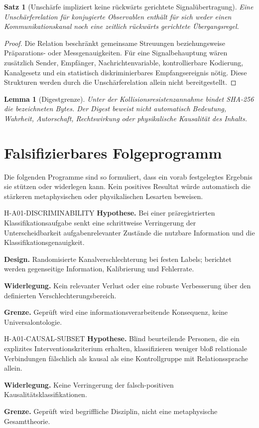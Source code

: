 \documentclass[11pt,a4paper]{article}
\newtheorem{satz}{Satz}
\newtheorem{lemma}{Lemma}
\begin{document}
\begin{satz}[Unschärfe impliziert keine rückwärts gerichtete Signalübertragung]
Eine Unschärferelation für konjugierte Observablen enthält für sich weder einen Kommunikationskanal noch eine zeitlich rückwärts gerichtete Übergangsregel.
\end{satz}
\begin{proof}
Die Relation beschränkt gemeinsame Streuungen beziehungsweise Präparations- oder Messgenauigkeiten. Für eine Signalbehauptung wären zusätzlich Sender, Empfänger, Nachrichtenvariable, kontrollierbare Kodierung, Kanalgesetz und ein statistisch diskriminierbares Empfangsereignis nötig. Diese Strukturen werden durch die Unschärferelation allein nicht bereitgestellt.
\end{proof}

\begin{lemma}[Digestgrenze]
Unter der Kollisionsresistenzannahme bindet SHA-256 die bezeichneten Bytes. Der Digest beweist nicht automatisch Bedeutung, Wahrheit, Autorschaft, Rechtswirkung oder physikalische Kausalität des Inhalts.
\end{lemma}

\section{Falsifizierbares Folgeprogramm}
Die folgenden Programme sind so formuliert, dass ein vorab festgelegtes Ergebnis sie stützen oder widerlegen kann. Kein positives Resultat würde automatisch die stärkeren metaphysischen oder physikalischen Lesarten beweisen.

\begin{boundarybox}{H-A01-DISCRIMINABILITY}
\textbf{Hypothese.} Bei einer präregistrierten Klassifikationsaufgabe senkt eine schrittweise Verringerung der Unterscheidbarkeit aufgabenrelevanter Zustände die nutzbare Information und die Klassifikationsgenauigkeit.\par
\textbf{Design.} Randomisierte Kanalverschlechterung bei festen Labels; berichtet werden gegenseitige Information, Kalibrierung und Fehlerrate.\par
\textbf{Widerlegung.} Kein relevanter Verlust oder eine robuste Verbesserung über den definierten Verschlechterungsbereich.\par
\textbf{Grenze.} Geprüft wird eine informationsverarbeitende Konsequenz, keine Universalontologie.
\end{boundarybox}

\begin{boundarybox}{H-A01-CAUSAL-SUBSET}
\textbf{Hypothese.} Blind beurteilende Personen, die ein explizites Interventionskriterium erhalten, klassifizieren weniger bloß relationale Verbindungen fälschlich als kausal als eine Kontrollgruppe mit Relationssprache allein.\par
\textbf{Widerlegung.} Keine Verringerung der falsch-positiven Kausalitätsklassifikationen.\par
\textbf{Grenze.} Geprüft wird begriffliche Disziplin, nicht eine metaphysische Gesamttheorie.
\end{boundarybox}
\end{document}
